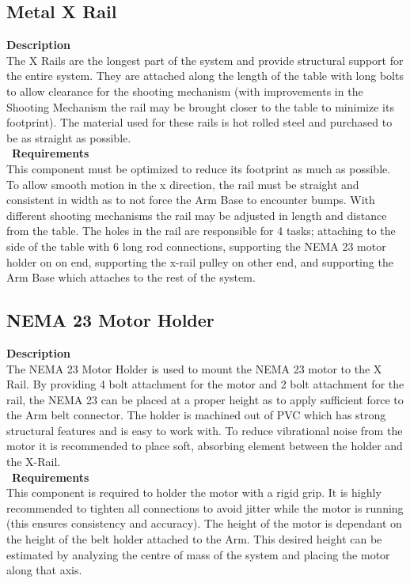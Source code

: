 \documentclass[titlepage]{article}
\begin{document}
\subsection{Metal X Rail}
\textbf{Description}\\
The X Rails are the longest part of the system and provide structural support for the entire system. They are attached along the length of the table with long bolts to allow clearance for the shooting mechanism (with improvements in the Shooting Mechanism the rail may be brought closer to the table to minimize its footprint). The material used for these rails is hot rolled steel and purchased to be as straight as possible.\\\
\textbf{Requirements}\\
This component must be optimized to reduce its footprint as much as possible. To allow smooth motion in the x direction, the rail must be straight and consistent in width as to not force the Arm Base to encounter bumps. With different shooting mechanisms the rail may be adjusted in length and distance from the table. The holes in the rail are responsible for 4 tasks; attaching to the side of the table with 6 long rod connections, supporting the NEMA 23 motor holder on on end, supporting the x-rail pulley on other end, and supporting the Arm Base which attaches to the rest of the system.

\subsection{NEMA 23 Motor Holder}
\textbf{Description}\\
The NEMA 23 Motor Holder is used to mount the NEMA 23 motor to the X Rail. By providing 4 bolt attachment for the motor and 2 bolt attachment for the rail, the NEMA 23 can be placed at a proper height as to apply sufficient force to the Arm belt connector. The holder is machined out of PVC which has strong structural features and is easy to work with. To reduce vibrational noise from the motor it is recommended to place soft, absorbing element between the holder and the X-Rail.\\\
\textbf{Requirements}\\
This component is required to holder the motor with a rigid grip. It is highly recommended to tighten all connections to avoid jitter while the motor is running (this ensures consistency and accuracy). The height of the motor is dependant on the height of the belt holder attached to the Arm. This desired height can be estimated by analyzing the centre of mass of the system and placing the motor along that axis. 
\end{document}
